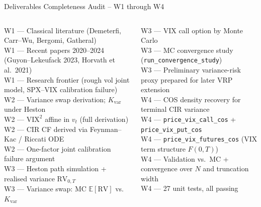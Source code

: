 \documentclass[aspectratio=169, 11pt]{beamer}
\begin{document}
\begin{frame}{Deliverables Completeness Audit -- W1 through W4}
\small
\begin{columns}[T]
\checkmark\; W1 --- Classical literature (Demeterfi, Carr--Wu, Bergomi, Gatheral)\\[2pt]
\checkmark\; W1 --- Recent papers 2020--2024 (Guyon--Lekeufack 2023, Horvath et al.\ 2021)\\[2pt]
\checkmark\; W1 --- Research frontier (rough vol joint model, SPX--VIX calibration failure)\\[2pt]
\checkmark\; W2 --- Variance swap derivation; $K_{\mathrm{var}}$ under Heston\\[2pt]
\checkmark\; W2 --- $\mathrm{VIX}^2$ affine in $v_t$ (full derivation)\\[2pt]
\checkmark\; W2 --- CIR CF derived via Feynman--Kac / Riccati ODE\\[2pt]
\checkmark\; W2 --- One-factor joint calibration failure argument\\[2pt]
\checkmark\; W3 --- Heston path simulation + realised variance $\mathrm{RV}_{0,T}$\\[2pt]
\checkmark\; W3 --- Variance swap: MC $\mathbb{E}[\mathrm{RV}]$ vs.\ $K_{\mathrm{var}}$

\checkmark\; W3 --- VIX call option by Monte Carlo\\[2pt]
\checkmark\; W3 --- MC convergence study (\texttt{run\_convergence\_study})\\[2pt]
\checkmark\; W3 --- Preliminary variance-risk proxy prepared for later VRP extension\\[2pt]
\checkmark\; W4 --- COS density recovery for terminal CIR variance\\[2pt]
\checkmark\; W4 --- \texttt{price\_vix\_call\_cos} + \texttt{price\_vix\_put\_cos}\\[2pt]
\checkmark\; W4 --- \texttt{price\_vix\_futures\_cos} (VIX term structure $F(0,T)$)\\[2pt]
\checkmark\; W4 --- Validation vs.\ MC + convergence over $N$ and truncation width\\[2pt]
\checkmark\; W4 --- 27 unit tests, all passing
\end{columns}
\end{frame}
\end{document}
